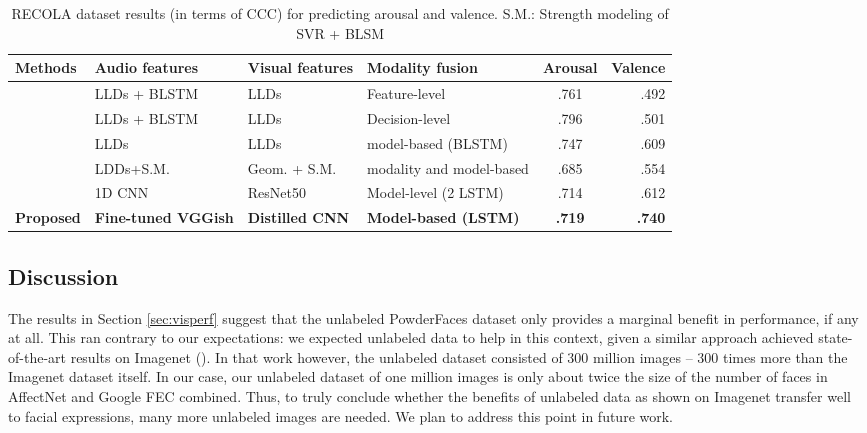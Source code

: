 \documentclass[times,twocolumn,final,authoryear]{elsarticle}
\begin{document}
	\begin{table*}
		\caption{RECOLA dataset results (in terms of CCC) for predicting arousal and valence. S.M.: Strength modeling of SVR + BLSM }
		\begin{tabular}{l|l|l | l |c|r } 
			\toprule 
			\textbf{Methods} & \textbf{Audio features} & \textbf{Visual features} & \textbf{Modality fusion} &\textbf{Arousal} & \textbf{ Valence}\\
			\midrule
			\midrule
			\cite{Ringeval2015} & LLDs + BLSTM & LLDs & Feature-level & .761 & .492\\  
			\midrule
			\cite{Ringeval2015} & LLDs + BLSTM& LLDs & Decision-level & .796 & .501 \\
			\midrule
			\cite{He2015} & LLDs & LLDs & model-based (BLSTM) & .747 & .609 \\
			\midrule
			\cite{Han2017} & LDDs+S.M.  & Geom. + S.M.  & modality and model-based & .685 & .554\\
			\midrule
			\cite{Tzarakis2017}& 1D CNN & ResNet50  & Model-level (2 LSTM) & .714 & .612  \\
			
			\midrule
			
			\textbf{Proposed} & \textbf{Fine-tuned VGGish} & \textbf{Distilled CNN} & \textbf{Model-based (LSTM)}  & \textbf{.719} & \textbf{.740}\\
			\bottomrule
		\end{tabular}
		
		\label{tab:comparison_existing_approaches}
	\end{table*}
	
	\subsection{Discussion}
	\label{sec:discussion}
	
	The results in Section \ref{sec:visperf} suggest that the unlabeled PowderFaces dataset only provides a marginal benefit in performance, if any at all. This ran contrary to our expectations: we expected unlabeled data to help in this context, given a similar approach achieved state-of-the-art results on Imagenet (\cite{xie2020self}). In that work however, the unlabeled dataset consisted of 300 million images -- 300 times more than the Imagenet dataset itself. In our case, our unlabeled dataset of one million images is only about twice the size of the number of faces in AffectNet and Google FEC combined. Thus, to truly conclude whether the benefits of unlabeled data as shown on Imagenet transfer well to facial expressions, many more unlabeled images are needed. We plan to address this point in future work.
	
\end{document}
